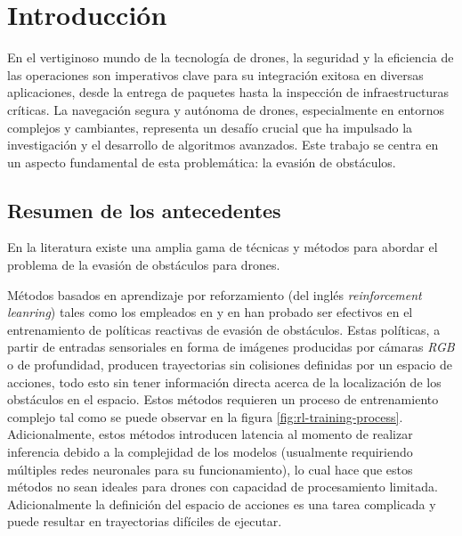 \chapter{Introducción}
    

    \par En el vertiginoso mundo de la tecnología de drones, la seguridad y la eficiencia de las operaciones son imperativos clave para su integración exitosa en diversas aplicaciones, desde la entrega de paquetes hasta la inspección de infraestructuras críticas. La navegación segura y autónoma de drones, especialmente en entornos complejos y cambiantes, representa un desafío crucial que ha impulsado la investigación y el desarrollo de algoritmos avanzados. Este trabajo se centra en un aspecto fundamental de esta problemática: la evasión de obstáculos.

\section{Resumen de los antecedentes}

    \par En la literatura existe una amplia gama de técnicas y métodos para abordar el problema de la evasión de obstáculos para drones. 
    
    \par Métodos basados en aprendizaje por reforzamiento (del inglés \textit{reinforcement leanring}) tales como los empleados en \cite{Tu2023} y en \cite{Xue2021} han probado ser efectivos en el entrenamiento de políticas reactivas de evasión de obstáculos. Estas políticas, a partir de entradas sensoriales en forma de imágenes producidas por cámaras \textit{RGB} o de profundidad, producen trayectorias sin colisiones definidas por un espacio de acciones, todo esto sin tener información directa acerca de la localización de los obstáculos en el espacio. Estos métodos requieren un proceso de entrenamiento complejo tal como se puede observar en la figura \ref{fig:rl-training-process}. Adicionalmente, estos métodos introducen latencia al momento de realizar inferencia debido a la complejidad de los modelos (usualmente requiriendo múltiples redes neuronales para su funcionamiento), lo cual hace que estos métodos no sean ideales para drones con capacidad de procesamiento limitada. Adicionalmente la definición del espacio de acciones es una tarea complicada y puede resultar en trayectorias difíciles de ejecutar.

